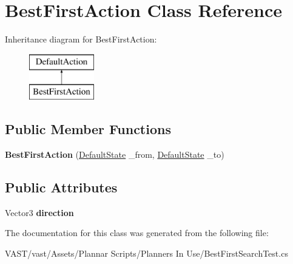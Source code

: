 \hypertarget{class_best_first_action}{\section{Best\-First\-Action Class Reference}
\label{class_best_first_action}
}
Inheritance diagram for Best\-First\-Action\-:\begin{figure}[H]
\begin{center}
\leavevmode
\includegraphics[height=2.000000cm]{class_best_first_action}
\end{center}
\end{figure}
\subsection*{Public Member Functions}
\begin{DoxyCompactItemize}
\item 
\hypertarget{class_best_first_action_a4bf1317d0be5523c3b6925fc2829ba4d}{{\bfseries Best\-First\-Action} (\hyperlink{class_default_state}{Default\-State} \-\_\-from, \hyperlink{class_default_state}{Default\-State} \-\_\-to)}\label{class_best_first_action_a4bf1317d0be5523c3b6925fc2829ba4d}

\end{DoxyCompactItemize}
\subsection*{Public Attributes}
\begin{DoxyCompactItemize}
\item 
\hypertarget{class_best_first_action_a20db99215323f8bb10f7bcbb90c5aa59}{Vector3 {\bfseries direction}}\label{class_best_first_action_a20db99215323f8bb10f7bcbb90c5aa59}

\end{DoxyCompactItemize}


The documentation for this class was generated from the following file\-:\begin{DoxyCompactItemize}
\item 
V\-A\-S\-T/vast/\-Assets/\-Plannar Scripts/\-Planners In Use/Best\-First\-Search\-Test.\-cs\end{DoxyCompactItemize}
